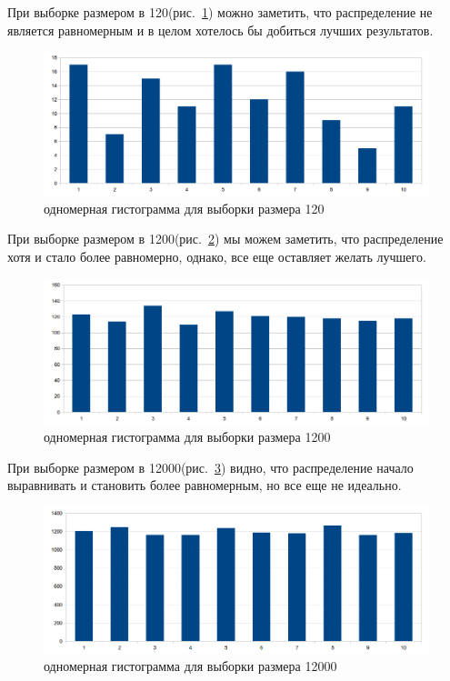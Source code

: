 \documentclass[a4paper,12pt]{article}
\begin{document}
При выборке размером в 120(рис.~\ref{fig:im2D_1}) можно заметить, что распределение не является равномерным и в целом хотелось бы добиться лучших результатов.
\begin{center}
	\begin{figure}[h]
	    \centering
   		\includegraphics[scale=0.25]{figure_1.png}
   		\caption{одномерная гистограмма для выборки размера 120}
   		\label{fig:im2D_1}
    \end{figure}
\end{center}

При выборке размером в 1200(рис.~\ref{fig:im2D_2}) мы можем заметить, что распределение хотя и стало более равномерно, однако, все еще оставляет желать лучшего.
\begin{center}
	\begin{figure}[h]
		\centering
   		\includegraphics[scale=0.25]{figure_2.png}
   		\caption{одномерная гистограмма для выборки размера 1200}
   		\label{fig:im2D_2}
    \end{figure}
\end{center}

При выборке размером в 12000(рис.~\ref{fig:im2D_3}) видно, что распределение начало выравнивать и становить более равномерным, но все еще не идеально.
\begin{center}
	\begin{figure}[h]
		\centering
   		\includegraphics[scale=0.25]{figure_3.png}
   		\caption{одномерная гистограмма для выборки размера 12000}
   		\label{fig:im2D_3}
    \end{figure}
\end{center}
\end{document}

